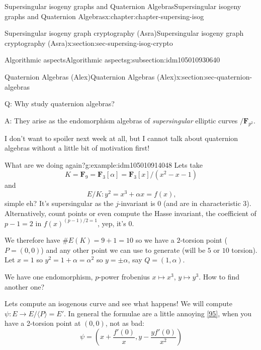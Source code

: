 \documentclass[oneside,10pt,]{book}
\numberwithin{equation}{section}
\newcommand{\FF}{\mathbf{F}}
\begin{document}
\begin{chapterptx}{Supersingular isogeny graphs and Quaternion Algebras}{}{Supersingular isogeny graphs and Quaternion Algebras}{}{}{x:chapter:chapter-supersing-isog}
\begin{sectionptx}{Supersingular isogeny graph cryptography (Asra)}{}{Supersingular isogeny graph cryptography (Asra)}{}{}{x:section:sec-supersing-isog-crypto}
\begin{subsectionptx}{Algorithmic aspects}{}{Algorithmic aspects}{}{}{g:subsection:idm105010930640}
\begin{enumerate}
\end{enumerate}
%
\end{subsectionptx}
\end{sectionptx}
%
%
\typeout{************************************************}
\typeout{************************************************}
%
\begin{sectionptx}{Quaternion Algebras (Alex)}{}{Quaternion Algebras (Alex)}{}{}{x:section:sec-quaternion-algebras}
\begin{introduction}{}%
Q: Why study quaternion algebras?%
\par
A: They arise as the endomorphism algebras of \emph{supersingular} elliptic curves \(/\FF_{p^2}\).%
\par
I don't want to spoiler next week at all, but I cannot talk about quaternion algebras without a little bit of motivation first!%
\begin{example}{What are we doing again?}{g:example:idm105010914048}%
Lets take%
\begin{equation*}
K = \FF_9 = \FF_3[\alpha] = \FF_3[x]/(x^2- x - 1)
\end{equation*}
and%
\begin{equation*}
E/K\colon y^2 = x^3 + \alpha x = f(x)\text{,}
\end{equation*}
simple eh? It's supersingular as the \(j\)-invariant is 0 (and are in characteristic 3). Alternatively, count points or even compute the Hasse invariant, the coefficient of \(p -1 = 2\) in \(f(x)^{(p-1)/2 = 1}\), yep, it's 0.%
\par
We therefore have \(\#E(K) = 9 + 1 = 10\) so we have a \(2\)-torsion point (\(P = (0,0)\)) and any other point we can use to generate (will be \(5\) or \(10\) torsion). Let \(x = 1\) so \(y^2 = 1 + \alpha = \alpha^2\) so \(y = \pm\alpha\), say \(Q = (1,\alpha)\).%
\par
We have one endomorphism, \(p\)-power frobenius \(x\mapsto x^3\), \(y\mapsto y^3\). How to find another one?%
\par
Lets compute an isogenous curve and see what happens! We will compute \(\psi\colon  E \to E/\langle P \rangle = E'\). In general the formulae are  a little annoying \hyperlink{x:biblio:bib-velu}{[95]}, when you have a 2-torsion point at \((0,0)\), not as bad:%
\begin{equation*}
\psi = \left(x + \frac{f'(0)}{x}, y - \frac{yf'(0)}{x^2} \right)
\end{equation*}
%
\begin{equation*}

\end{equation*}
\end{example}
\end{introduction}
\end{sectionptx}
\end{chapterptx}
\end{document}
